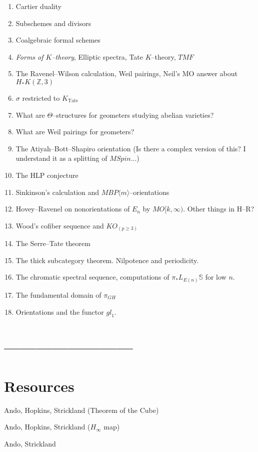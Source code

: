 \documentclass{amsart}
\newcommand{\Z}{\mathbb Z}
\renewcommand{\S}{\mathbb S}
\newcommand{\<}{\langle}
\renewcommand{\>}{\rangle}
\newcommand{\Spin}{\mathit{Spin}}
\newcommand{\TMF}{\mathit{TMF}}
\newcommand{\BP}{\mathit{BP}}
\newcommand{\Tate}{\mathrm{Tate}}
\newcommand{\gl}{\mathit{gl}}
\theoremstyle{plain}
\theoremstyle{definition}
\theoremstyle{remark}
\begin{document}
\begin{enumerate}
---------------------
\item Cartier duality
\item Subschemes and divisors
\item Coalgebraic formal schemes
\item \textit{Forms of $K$--theory}, Elliptic spectra, Tate $K$--theory, $\TMF$
\item The Ravenel--Wilson calculation, Weil pairings, Neil's MO answer about $H_* K(\Z, 3)$
\item $\sigma$ restricted to $K_{\Tate}$
\item What are $\Theta$--structures for geometers studying abelian varieties?
\item What are Weil pairings for geometers?
\item The Atiyah--Bott--Shapiro orientation (Is there a complex version of this? I understand it as a splitting of $M\Spin$...)
\item The HLP conjecture
\item Sinkinson's calculation and $M\BP\<m\>$--orientations
\item Hovey--Ravenel on nonorientations of $E_n$ by $MO[k, \infty)$. Other things in H--R?
\item Wood's cofiber sequence and $KO_{(p \ge 3)}$
\item The Serre--Tate theorem
\item The thick subcategory theorem.  Nilpotence and periodicity.
\item The chromatic spectral sequence, computations of $\pi_* L_{E(n)} \S$ for low $n$.
\item The fundamental domain of $\pi_{GH}$
\item Orientations and the functor $\gl_1$.
\end{enumerate}

\section{------------------------}



\section{Resources}

Ando, Hopkins, Strickland (Theorem of the Cube)

Ando, Hopkins, Strickland ($H_\infty$ map)

Ando, Strickland
\end{document}
